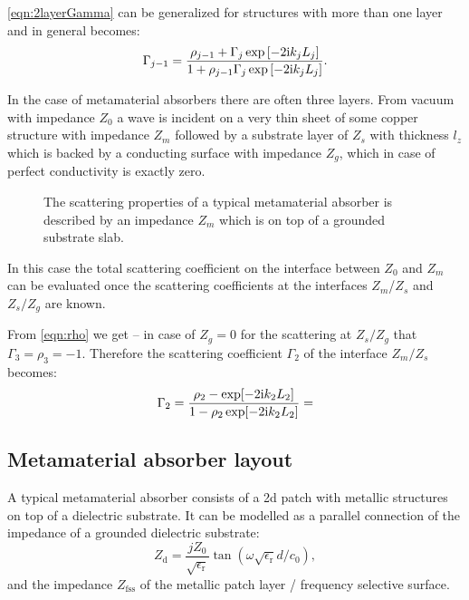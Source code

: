 \cref{eqn:2layerGamma} can be generalized for structures with more than one layer and in general becomes:
\begin{equation}
\Gamma_{j-1} = \frac{\rho_{j-1}+\Gamma_j \exp\left[-2\mathrm{i} k_j L_j\right]}
{1+\rho_{j-1}\Gamma_j \exp\left[-2\mathrm{i} k_j L_j\right]}.
\label{eqn:NlayerGamma}
\end{equation}

In the case of metamaterial absorbers there are often three layers. From vacuum with impedance $Z_0$ a wave is incident on a very thin sheet of some copper structure with impedance $Z_m$ followed by a substrate layer of $Z_s$ with thickness $l_z$ which is backed by a conducting surface with impedance $Z_g$, which in case of perfect conductivity is exactly zero.

\begin{figure}
\centering
{}
\caption{The scattering properties of a typical metamaterial absorber is described by an impedance $Z_m$ which is on top of a grounded substrate slab.}
\label{fig:Nstacked_structure}
\end{figure}

In this case the total scattering coefficient on the interface between $Z_0$ and $Z_m$ can be evaluated once the scattering coefficients at the interfaces $Z_m$/$Z_s$ and $Z_s/Z_g$ are known.

From \cref{eqn:rho} we get -- in case of $Z_g=0$ for the scattering at $Z_s/Z_g$ that $\Gamma_3=\rho_3=-1$. Therefore the scattering coefficient $\Gamma_2$ of the interface $Z_m/Z_s$ becomes:
\begin{equation}
\Gamma_2 = \frac{\rho_2- \exp[-2\mathrm{i} k_2 L_2]}
			    {1-\rho_2\exp[-2\mathrm{i} k_2 L_2]}
	    =
\end{equation}

\subsection{Metamaterial absorber layout}
A typical metamaterial absorber consists of a 2d patch with metallic structures on top of a dielectric substrate.
It can be modelled as a parallel connection of the impedance of a grounded dielectric substrate:
\begin{equation}
Z_\mathrm{d} = \frac{jZ_0}{\sqrt{\epsilon_\mathrm{r}}} \tan\left(\omega \sqrt{\epsilon_\mathrm{r}}d/c_0 \right),
\end{equation}
and the impedance $Z_\mathrm{fss}$ of the metallic patch layer / frequency selective surface.

